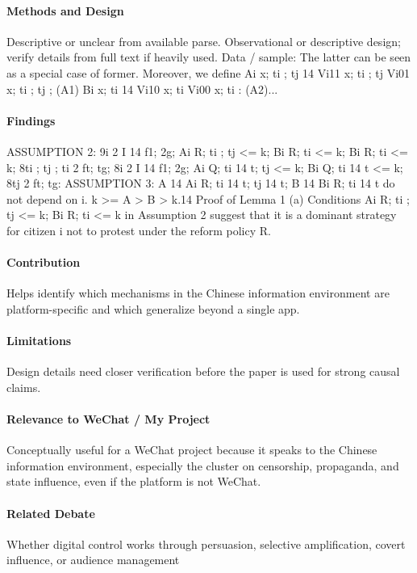 \documentclass[12pt]{article}
\begin{document}
\paragraph{Methods and Design} Descriptive or unclear from available parse. Observational or descriptive design; verify details from full text if heavily used. Data / sample: The latter can be seen as a special case of former. Moreover, we define Ai x; ti ; tj  14 Vi11 x; ti ; tj   Vi01 x; ti ; tj ; (A1) Bi x; ti  14 Vi10 x; ti   Vi00 x; ti : (A2)...

\paragraph{Findings} ASSUMPTION 2: 9i 2 I 14 f1; 2g; Ai R; ti ; tj  <= k; Bi R; ti  <= k; Bi R; ti  <= k; 8ti ; tj ; ti 2 ft; tg; 8i 2 I 14 f1; 2g; Ai Q; ti 14 t; tj  <= k; Bi Q; ti 14 t <= k; 8tj 2 ft; tg: ASSUMPTION 3: A 14 Ai R; ti 14 t; tj 14 t; B 14 Bi R; ti 14 t do not depend on i. k >= A > B > k.14 Proof of Lemma 1 (a) Conditions Ai R; ti ; tj  <= k; Bi R; ti  <= k in Assumption 2 suggest that it is a dominant strategy for citizen i not to protest under the reform policy R.

\paragraph{Contribution} Helps identify which mechanisms in the Chinese information environment are platform-specific and which generalize beyond a single app.

\paragraph{Limitations} Design details need closer verification before the paper is used for strong causal claims.

\paragraph{Relevance to WeChat / My Project} Conceptually useful for a WeChat project because it speaks to the Chinese information environment, especially the cluster on censorship, propaganda, and state influence, even if the platform is not WeChat.

\paragraph{Related Debate} Whether digital control works through persuasion, selective amplification, covert influence, or audience management
\end{document}
